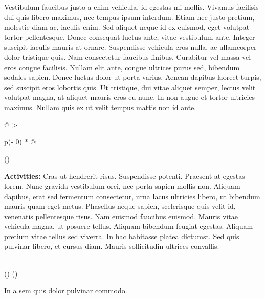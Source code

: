 \documentclass[
]{book}
\begin{document}
Vestibulum faucibus justo a enim vehicula, id egestas mi mollis. Vivamus facilisis dui quis libero maximus, nec tempus ipsum interdum. Etiam nec justo pretium, molestie diam ac, iaculis enim. Sed aliquet neque id ex euismod, eget volutpat tortor pellentesque. Donec consequat luctus ante, vitae vestibulum ante. Integer suscipit iaculis mauris at ornare. Suspendisse vehicula eros nulla, ac ullamcorper dolor tristique quis. Nam consectetur faucibus finibus. Curabitur vel massa vel eros congue facilisis. Nullam elit ante, congue ultrices purus sed, bibendum sodales sapien. Donec luctus dolor ut porta varius. Aenean dapibus laoreet turpis, sed suscipit eros lobortis quis. Ut tristique, dui vitae aliquet semper, lectus velit volutpat magna, at aliquet mauris eros eu nunc. In non augue et tortor ultricies maximus. Nullam quis ex ut velit tempus mattis non id ante.

\begin{longtable}[]{@{}
  >{\raggedright\arraybackslash}p{(\columnwidth - 0\tabcolsep) * }@{}}
\toprule()
\begin{minipage}[b]{\linewidth}\raggedright
\textbf{Activities:} Cras ut hendrerit risus. Suspendisse potenti. Praesent at egestas lorem. Nunc gravida vestibulum orci, nec porta sapien mollis non. Aliquam dapibus, erat sed fermentum consectetur, urna lacus ultricies libero, ut bibendum mauris quam eget metus. Phasellus neque sapien, scelerisque quis velit id, venenatis pellentesque risus. Nam euismod faucibus euismod. Mauris vitae vehicula magna, ut posuere tellus. Aliquam bibendum feugiat egestas. Aliquam pretium vitae tellus sed viverra. In hac habitasse platea dictumst. Sed quis pulvinar libero, et cursus diam. Mauris sollicitudin ultrices convallis.
\end{minipage} \\
\midrule()
\endhead
\bottomrule()
\end{longtable}

In a sem quis dolor pulvinar commodo.
\end{document}
